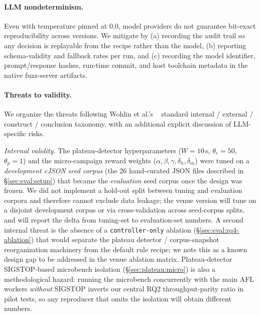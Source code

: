 \documentclass[11pt]{article}
\begin{document}
\paragraph{LLM nondeterminism.}
Even with temperature pinned at $0.0$, model providers do not
guarantee bit-exact reproducibility across versions. We mitigate
by (a) recording the audit trail so any decision is replayable from
the recipe rather than the model, (b) reporting schema-validity and
fallback rates per run, and (c) recording the model identifier,
prompt/response hashes, run-time commit, and host toolchain metadata
in the native fuzz-server artifacts.

\paragraph{Threats to validity.}
We organize the threats following Wohlin et al.'s
~\cite{wohlin2012experimentation} standard
internal / external / construct / conclusion taxonomy, with an
additional explicit discussion of LLM-specific risks.

\emph{Internal validity.} The plateau-detector hyperparameters
($W{=}10$\,s, $\theta_e{=}50$, $\theta_p{=}1$) and the
micro-campaign reward weights
($\alpha,\beta,\gamma,\delta_h,\delta_m$) were tuned on a
\emph{development cJSON seed corpus} (the 26 hand-curated JSON
files described in \S\ref{sec:eval:setup}) that became the
\emph{evaluation} seed corpus once the design was frozen. We did
not implement a hold-out split between tuning and evaluation
corpora and therefore cannot exclude data leakage; the venue
version will tune on a disjoint development corpus or via
cross-validation across seed-corpus splits, and will report the
delta from tuning-set to evaluation-set numbers. A second
internal threat is the absence of a \texttt{controller-only}
ablation (\S\ref{sec:eval:rq4-ablation}) that would separate the
plateau detector / corpus-snapshot reorganization machinery from
the default rule recipe; we note this as a known design gap to be
addressed in the venue ablation matrix. Plateau-detector
SIGSTOP-based microbench isolation
(\S\ref{sec:plateau:micro}) is also a methodological hazard:
running the microbench concurrently with the main AFL workers
\emph{without} SIGSTOP inverts our central RQ2 throughput-parity
ratio in pilot tests, so any reproducer that omits the isolation
will obtain different numbers.
\end{document}
